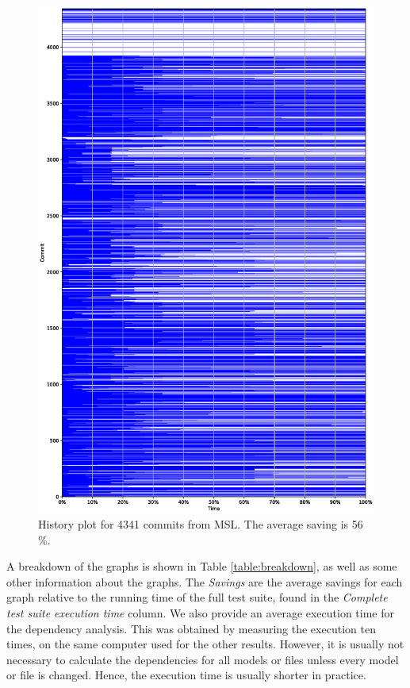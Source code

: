 \documentclass{cslthse-msc}
\begin{document}
\begin{figure}[!htbp]
    \centering
    \includegraphics[width=\textwidth]{Graphs/MSL_history_plot.eps}
    \caption{History plot for 4341 commits from MSL. The average saving is 56 \%.}
    \label{fig:mslhistory}
\end{figure}

A breakdown of the graphs is shown in Table \ref{table:breakdown}, as well as some other information about the graphs. The \textit{Savings} are the average savings for each graph relative to the running time of the full test suite, found in the \textit{Complete test suite execution time} column. We also provide an average execution time for the dependency analysis. This was obtained by measuring the execution ten times, on the same computer used for the other results. However, it is usually not necessary to calculate the dependencies for all models or files unless every model or file is changed. Hence, the execution time is usually shorter in practice.
\end{document}
